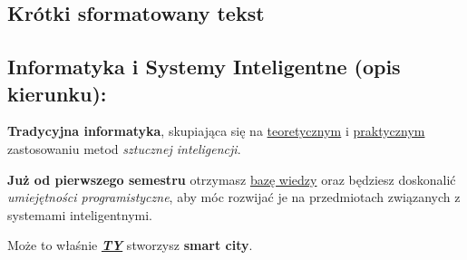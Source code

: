 \subsection{Krótki sformatowany tekst}
\hfill
\begin{center}
    \section*{Informatyka i Systemy Inteligentne (opis kierunku):}
\end{center}
\begin{flushleft}
\setlength{\parindent}{30pt}
\indent \par \textbf{Tradycyjna informatyka}, skupiająca się na \underline{teoretycznym} i \underline{praktycznym} zastosowaniu metod \emph{sztucznej inteligencji}.\par 
\textbf{Już od pierwszego semestru} otrzymasz \underline{bazę wiedzy} oraz będziesz doskonalić \emph{umiejętności programistyczne}, aby móc rozwijać je na przedmiotach związanych z systemami inteligentnymi. \par
Może to właśnie \textbf{\emph{\underline{TY}}} stworzysz \textbf{smart city}.
\end{flushleft}